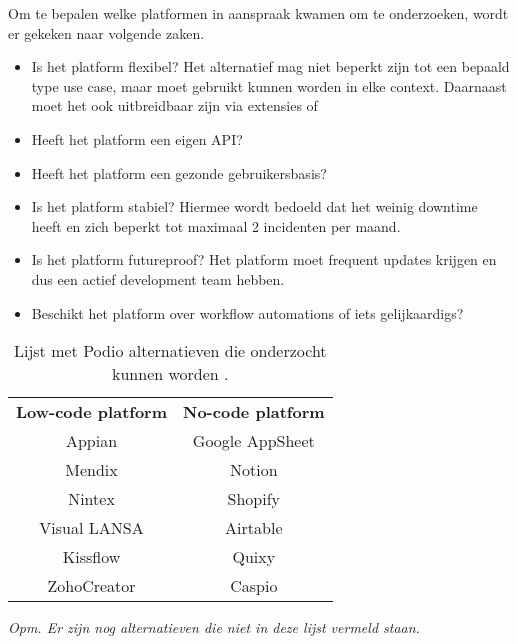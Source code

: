 Om te bepalen welke platformen in aanspraak kwamen om te onderzoeken, wordt er gekeken naar volgende zaken.

\begin{itemize}
    \item Is het platform flexibel? Het alternatief mag niet beperkt zijn tot een bepaald type use case, maar moet gebruikt kunnen worden in elke context. Daarnaast moet het ook uitbreidbaar zijn via extensies of 
    \item Heeft het platform een eigen API?
    \item Heeft het platform een gezonde gebruikersbasis? %
    \item Is het platform stabiel? Hiermee wordt bedoeld dat het weinig downtime heeft en zich beperkt tot maximaal 2 incidenten per maand. 
    \item Is het platform futureproof? Het platform moet frequent updates krijgen en dus een actief development team hebben.
    \item Beschikt het platform over workflow automations of iets gelijkaardigs?
\end{itemize}

\begin{table}[ht]
    \centering
    \caption{\label{tab:Tabel 1} Lijst met Podio alternatieven die onderzocht kunnen worden \autocite{Tasmia2022}.}
    \begin{tabular}{ | c | c | }
        \hline
        \textbf{Low-code platform} & \textbf{No-code platform}
        \hline \\
        Appian & Google AppSheet \\
        Mendix & Notion \\
        Nintex & Shopify \\
        Visual LANSA & Airtable \\
        Kissflow & Quixy \\
        ZohoCreator & Caspio \\
        \hline
    \end{tabular}
    
    {\raggedright \textit{Opm. Er zijn nog alternatieven die niet in deze lijst vermeld staan.} \par}
\end{table}

